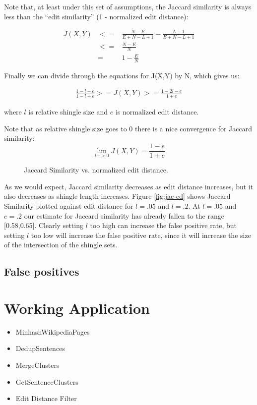 \documentclass{acm_proc_article-sp}
\begin{document}
Note that, at least under this set of assumptions, the Jaccard similarity is always less than the ``edit similarity'' (1 - normalized edit distance):

\begin{eqnarray*}
J(X,Y) & <= & \frac{N - E}{E + N - L + 1} - \frac{L - 1}{E + N - L + 1} \\
       & <= & \frac{N - E}{N} \\ 
       & =  & 1 - \frac{E}{N}
\end{eqnarray*}

Finally we can divide through the equations for J(X,Y) by N, which gives us:

\begin{eqnarray*}
\frac{1 - l - e}{1 - l + e} >= J(X,Y) >= \frac{1 - 2l - e}{1 + e}
\end{eqnarray*}

where $l$ is relative shingle size and $e$ is normalized edit distance.

Note that as relative shingle size goes to 0 there is a nice convergence for Jaccard similarity:
\[\lim_{l->0}J(X,Y) = \frac{1 - e}{1 + e}\]

\begin{figure}
\centering
{}
\caption{Jaccard Similarity vs. normalized edit distance.}
\label{jac-ed}
\end{figure}

As we would expect, Jaccard similarity decreases as edit distance increases, but it also decreases as shingle length increases. Figure \ref{fig:jac-ed} shows Jaccard Similarity plotted against edit distance for $l = .05$ and $l = .2$. At $l = .05$ and $e = .2$ our estimate for Jaccard similarity has already fallen to the range [0.58,0.65]. Clearly setting $l$ too high can increase the false positive rate, but setting $l$ too low will increase the false positive rate, since it will increase the size of the intersection of the shingle sets.

\subsection{False positives}

\begin{figure}
\centering
{}
\caption{}
\label{ed-grid}
\end{figure}

\section{Working Application}
\begin{itemize}
\item MinhashWikipediaPages
\item DedupSentences
\item MergeClusters
\item GetSentenceClusters
\item Edit Distance Filter
\end{itemize}
\end{document}
